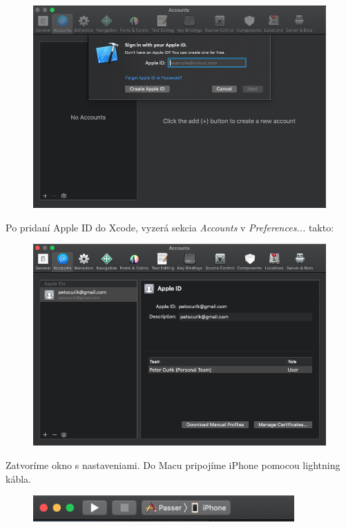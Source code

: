 \begin{figure}[H]
  \centering
  \includegraphics[width=14cm]{img/tutorial3.png}
  \label{tutorial3}
\end{figure}

\noindent Po pridaní Apple ID do Xcode, vyzerá sekcia \textit{Accounts} v \textit{Preferences...} takto:

\begin{figure}[H]
  \centering
  \includegraphics[width=14cm]{img/tutorial4.png}
  \label{tutorial4}
\end{figure}

\noindent Zatvoríme okno s nastaveniami. Do Macu pripojíme iPhone pomocou lightning kábla.
\newpage

\begin{figure}[H]
  \centering
  \includegraphics[width=10cm]{img/tutorial5.png}
  \label{tutorial5}
\end{figure}

